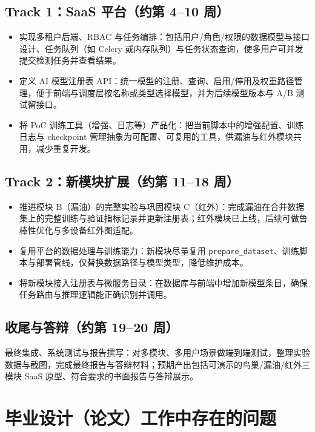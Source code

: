 \documentclass[12pt,a4paper]{article}
\begin{document}
\subsection{Track 1：SaaS 平台（约第 4--10 周）}

\begin{itemize}
  \item 实现多租户后端、RBAC 与任务编排：包括用户/角色/权限的数据模型与接口设计、任务队列（如 Celery 或内存队列）与任务状态查询，使多用户可并发提交检测任务并查看结果。
  \item 定义 AI 模型注册表 API：统一模型的注册、查询、启用/停用及权重路径管理，便于前端与调度层按名称或类型选择模型，并为后续模型版本与 A/B 测试留接口。
  \item 将 PoC 训练工具（增强、日志等）产品化：把当前脚本中的增强配置、训练日志与 checkpoint 管理抽象为可配置、可复用的工具，供漏油与红外模块共用，减少重复开发。
\end{itemize}

\subsection{Track 2：新模块扩展（约第 11--18 周）}

\begin{itemize}
  \item 推进模块 B（漏油）的完整实验与巩固模块 C（红外）：完成漏油在合并数据集上的完整训练与验证指标记录并更新注册表；红外模块已上线，后续可做鲁棒性优化与多设备红外图适配。
  \item 复用平台的数据处理与训练能力：新模块尽量复用 \texttt{prepare\_dataset}、训练脚本与部署管线，仅替换数据路径与模型类型，降低维护成本。
  \item 将新模块接入注册表与微服务目录：在数据库与前端中增加新模型条目，确保任务路由与推理逻辑能正确识别并调用。
\end{itemize}

\subsection{收尾与答辩（约第 19--20 周）}

最终集成、系统测试与报告撰写：对多模块、多用户场景做端到端测试，整理实验数据与截图，完成最终报告与答辩材料；预期产出包括可演示的鸟巢/漏油/红外三模块 SaaS 原型、符合要求的书面报告与答辩展示。

\section{毕业设计（论文）工作中存在的问题}
\end{document}
